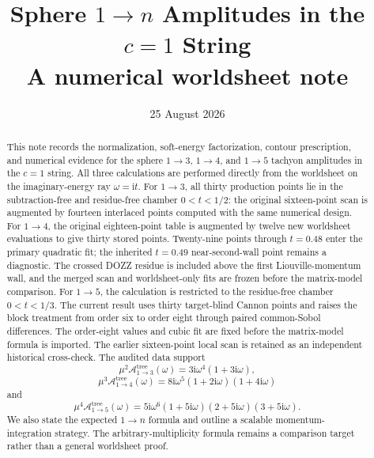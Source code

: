 \documentclass[11pt]{article}
\title{Sphere \texorpdfstring{$1\to n$}{1 to n} Amplitudes in the
       \texorpdfstring{$c=1$}{c=1} String\\[0.4em]
       \large A numerical worldsheet note}
\author{}
\date{25 August 2026}
\newcommand{\ii}{\mathrm{i}}
\newcommand{\A}{\mathcal{A}}
\begin{document}
\maketitle

\begin{abstract}
This note records the normalization, soft-energy factorization, contour
prescription, and numerical evidence for the sphere $1\to3$, $1\to4$, and
$1\to5$ tachyon amplitudes in the $c=1$ string.  All three calculations are performed
directly from the worldsheet on the imaginary-energy ray $\omega=\ii t$.
For $1\to3$, all thirty production points lie in the subtraction-free and
residue-free chamber $0<t<1/2$: the original sixteen-point scan is augmented
by fourteen interlaced points computed with the same numerical design.  For
$1\to4$, the original eighteen-point table is augmented by twelve new
worldsheet evaluations to give thirty stored points.  Twenty-nine points
through $t=0.48$ enter the primary quadratic fit; the inherited $t=0.49$
near-second-wall point remains a diagnostic.  The crossed DOZZ residue is
included above the first Liouville-momentum wall, and the merged scan and
worldsheet-only fits are frozen before the matrix-model comparison.  For
$1\to5$, the calculation is restricted to the residue-free chamber
$0<t<1/3$.  The current result uses thirty target-blind Cannon points and
raises the block treatment from order six to order eight through paired
common-Sobol differences.  The order-eight values and cubic fit are fixed
before the matrix-model formula is imported.  The earlier sixteen-point
local scan is retained as an independent historical cross-check.  The
audited data support
\begin{equation*}
  \mu^2\A^{\mathrm{tree}}_{1\to3}(\omega)
  =3\ii\omega^4(1+3\ii\omega),
\end{equation*}
\begin{equation*}
  \mu^3\A^{\mathrm{tree}}_{1\to4}(\omega)
  =8\ii\omega^5(1+2\ii\omega)(1+4\ii\omega)
\end{equation*}
and
\begin{equation*}
  \mu^4\A^{\mathrm{tree}}_{1\to5}(\omega)
  =5\ii\omega^6(1+5\ii\omega)(2+5\ii\omega)(3+5\ii\omega).
\end{equation*}
We also state the expected $1\to n$ formula and outline a scalable
momentum-integration strategy.  The arbitrary-multiplicity formula remains a
comparison target rather than a general worldsheet proof.
\end{abstract}

\tableofcontents
\end{document}
